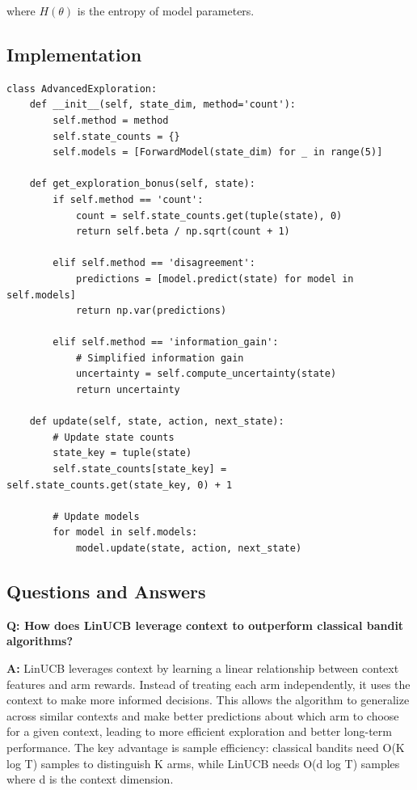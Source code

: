 \documentclass[12pt]{article}
\begin{document}
{{{where $H(\theta)$ is the entropy of model parameters.

\subsection{Implementation}

\begin{verbatim}
class AdvancedExploration:
    def __init__(self, state_dim, method='count'):
        self.method = method
        self.state_counts = {}
        self.models = [ForwardModel(state_dim) for _ in range(5)]
        
    def get_exploration_bonus(self, state):
        if self.method == 'count':
            count = self.state_counts.get(tuple(state), 0)
            return self.beta / np.sqrt(count + 1)
            
        elif self.method == 'disagreement':
            predictions = [model.predict(state) for model in self.models]
            return np.var(predictions)
            
        elif self.method == 'information_gain':
            # Simplified information gain
            uncertainty = self.compute_uncertainty(state)
            return uncertainty
            
    def update(self, state, action, next_state):
        # Update state counts
        state_key = tuple(state)
        self.state_counts[state_key] = self.state_counts.get(state_key, 0) + 1
        
        # Update models
        for model in self.models:
            model.update(state, action, next_state)
\end{verbatim}

\subsection{Questions and Answers}

\textbf{Q: How does LinUCB leverage context to outperform classical bandit algorithms?}

\textbf{A:} LinUCB leverages context by learning a linear relationship between context features and arm rewards. Instead of treating each arm independently, it uses the context to make more informed decisions. This allows the algorithm to generalize across similar contexts and make better predictions about which arm to choose for a given context, leading to more efficient exploration and better long-term performance. The key advantage is sample efficiency: classical bandits need O(K log T) samples to distinguish K arms, while LinUCB needs O(d log T) samples where d is the context dimension.

}}}
\end{document}
